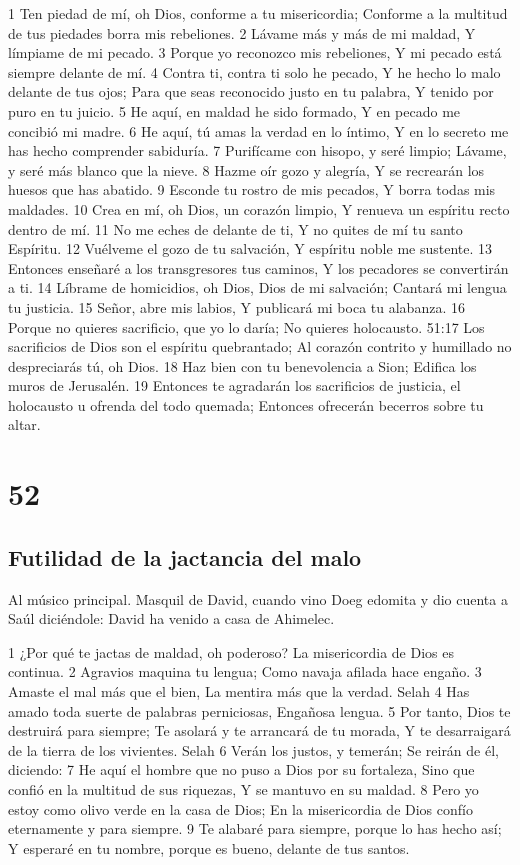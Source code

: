 1 Ten piedad de mí, oh Dios, conforme a tu misericordia;
Conforme a la multitud de tus piedades borra mis rebeliones.
2 Lávame más y más de mi maldad,
Y límpiame de mi pecado.
3 Porque yo reconozco mis rebeliones,
Y mi pecado está siempre delante de mí.
4 Contra ti, contra ti solo he pecado,
Y he hecho lo malo delante de tus ojos;
Para que seas reconocido justo en tu palabra,
Y tenido por puro en tu juicio.
5 He aquí, en maldad he sido formado,
Y en pecado me concibió mi madre.
6 He aquí, tú amas la verdad en lo íntimo,
Y en lo secreto me has hecho comprender sabiduría.
7 Purifícame con hisopo, y seré limpio;
Lávame, y seré más blanco que la nieve.
8 Hazme oír gozo y alegría,
Y se recrearán los huesos que has abatido.
9 Esconde tu rostro de mis pecados,
Y borra todas mis maldades.
10 Crea en mí, oh Dios, un corazón limpio,
Y renueva un espíritu recto dentro de mí.
11 No me eches de delante de ti,
Y no quites de mí tu santo Espíritu.
12 Vuélveme el gozo de tu salvación,
Y espíritu noble me sustente.
13 Entonces enseñaré a los transgresores tus caminos,
Y los pecadores se convertirán a ti.
14 Líbrame de homicidios, oh Dios, Dios de mi salvación;
Cantará mi lengua tu justicia.
15 Señor, abre mis labios,
Y publicará mi boca tu alabanza.
16 Porque no quieres sacrificio, que yo lo daría;
No quieres holocausto.
51:17 Los sacrificios de Dios son el espíritu quebrantado;
Al corazón contrito y humillado no despreciarás tú, oh Dios.
18 Haz bien con tu benevolencia a Sion;
Edifica los muros de Jerusalén.
19 Entonces te agradarán los sacrificios de justicia,
el holocausto u ofrenda del todo quemada;
Entonces ofrecerán becerros sobre tu altar.

\chapter{52}

\section*{Futilidad de la jactancia del malo}

Al músico principal. Masquil de David, cuando vino Doeg edomita y dio cuenta a Saúl diciéndole: David ha venido a casa de Ahimelec.

1 ¿Por qué te jactas de maldad, oh poderoso?
La misericordia de Dios es continua.
2 Agravios maquina tu lengua;
Como navaja afilada hace engaño.
3 Amaste el mal más que el bien,
La mentira más que la verdad. Selah
4 Has amado toda suerte de palabras perniciosas,
Engañosa lengua.
5 Por tanto, Dios te destruirá para siempre;
Te asolará y te arrancará de tu morada,
Y te desarraigará de la tierra de los vivientes. Selah
6 Verán los justos, y temerán;
Se reirán de él, diciendo:
7 He aquí el hombre que no puso a Dios por su fortaleza,
Sino que confió en la multitud de sus riquezas,
Y se mantuvo en su maldad.
8 Pero yo estoy como olivo verde en la casa de Dios;
En la misericordia de Dios confío eternamente y para siempre.
9 Te alabaré para siempre, porque lo has hecho así;
Y esperaré en tu nombre, porque es bueno, delante de tus santos.


